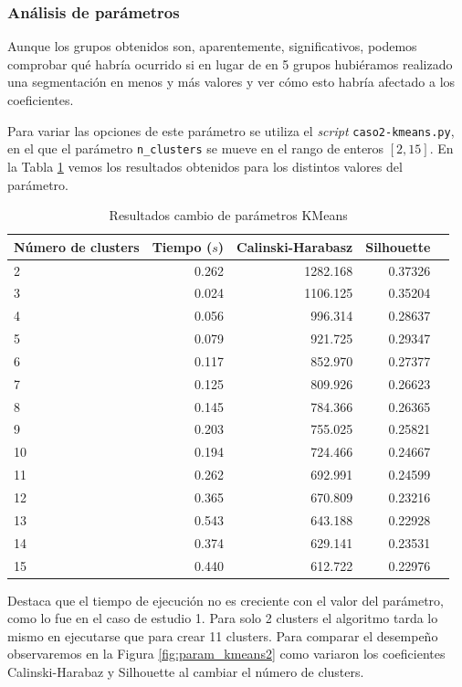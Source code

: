 \documentclass[a4paper, 20pt]{article}
\begin{document}
\subsubsection{Análisis de parámetros}

Aunque los grupos obtenidos son, aparentemente, significativos, podemos comprobar qué habría ocurrido si en lugar de en 5 grupos hubiéramos realizado una segmentación en menos y más valores y ver cómo esto habría afectado a los coeficientes.

Para variar las opciones de este parámetro se utiliza el \textit{script} \texttt{caso2-kmeans.py}, en el que el parámetro \texttt{n\_clusters} se mueve en el rango de enteros $[2,15]$. En la Tabla \ref{tab:param_kmeans2} vemos los resultados obtenidos para los distintos valores del parámetro.

\begin{table}[H]
\centering
\caption{Resultados cambio de parámetros KMeans}
\label{tab:param_kmeans2}
\begin{tabular}{lrrrr}
\toprule
Número de clusters & Tiempo ($s$) & Calinski-Harabasz & Silhouette &\\
\midrule
2 & 0.262 & 1282.168 & 0.37326 \\
3 & 0.024 & 1106.125 & 0.35204 \\
4 & 0.056 & 996.314 & 0.28637 \\
5 & 0.079 & 921.725 & 0.29347 \\
6 & 0.117 & 852.970 & 0.27377 \\
7 & 0.125 & 809.926 & 0.26623 \\
8 & 0.145 & 784.366 & 0.26365 \\
9 & 0.203 & 755.025 & 0.25821 \\
10 & 0.194 & 724.466 & 0.24667 \\
11 & 0.262 & 692.991 & 0.24599 \\
12 & 0.365 & 670.809 & 0.23216 \\
13 & 0.543 & 643.188 & 0.22928 \\
14 & 0.374 & 629.141 & 0.23531 \\
15 & 0.440 & 612.722 & 0.22976 \\
\bottomrule
\end{tabular}
\end{table}

Destaca que el tiempo de ejecución no es creciente con el valor del parámetro, como lo fue en el caso de estudio 1. Para solo 2 clusters el algoritmo tarda lo mismo en ejecutarse que para crear 11 clusters. Para comparar el desempeño observaremos en la Figura  \ref{fig:param_kmeans2} como variaron los coeficientes Calinski-Harabaz y Silhouette al cambiar el número de clusters.
\end{document}
